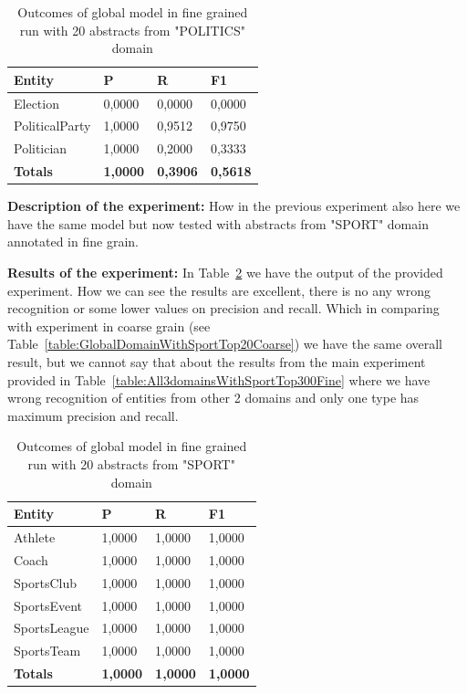 \documentclass[thesis=M,english]{FITthesis}[2018/05/30]
\begin{document}
	\begin{table}[H]\centering
		\begin{tabular}{|l|l|l|l|}
			\hline {\textbf{Entity}} & {\textbf{P}} & {\textbf{R}} & {\textbf{F1}}\\\hline
				Election & 0,0000 & 0,0000 & 0,0000\\
				PoliticalParty & 1,0000 & 0,9512 & 0,9750\\
				Politician & 1,0000 & 0,2000 & 0,3333\\\hline
				\textbf{Totals} & \textbf{1,0000} & \textbf{0,3906} & \textbf{0,5618}\\\hline
		\end{tabular}
		\caption{Outcomes of global model in fine grained run with 20 abstracts from "POLITICS" domain \label{table:GlobalDomainWithPoliticsTop20Fine}}
	\end{table}	

\textbf{Description of the experiment:} How in the previous experiment also here we have the same model but now tested with abstracts from "SPORT" domain annotated in fine grain.

\textbf{Results of the experiment:} In Table~\ref{table:GlobalDomainWithSportTop20Fine} we have the output of the provided experiment. How we can see the results are excellent, there is no any wrong recognition or some lower values on precision and recall. Which in comparing with experiment in coarse grain (see Table~\ref{table:GlobalDomainWithSportTop20Coarse}) we have the same overall result, but we cannot say that about the results from the main experiment provided in Table~\ref{table:All3domainsWithSportTop300Fine} where we have wrong recognition of entities from other 2 domains and only one type has maximum precision and recall.

	\begin{table}[H]\centering
		\begin{tabular}{|l|l|l|l|}
			\hline {\textbf{Entity}} & {\textbf{P}} & {\textbf{R}} & {\textbf{F1}}\\\hline
				Athlete & 1,0000 & 1,0000 & 1,0000\\
				Coach & 1,0000 & 1,0000 & 1,0000\\
				SportsClub & 1,0000 & 1,0000 & 1,0000\\
				SportsEvent & 1,0000 & 1,0000 & 1,0000\\
				SportsLeague & 1,0000 & 1,0000 & 1,0000\\
				SportsTeam & 1,0000 & 1,0000 & 1,0000\\\hline
				\textbf{Totals} & \textbf{1,0000} & \textbf{1,0000} & \textbf{1,0000}\\\hline
		\end{tabular}
		\caption{Outcomes of global model in fine grained run with 20 abstracts from "SPORT" domain \label{table:GlobalDomainWithSportTop20Fine}}
	\end{table}	
\end{document}
